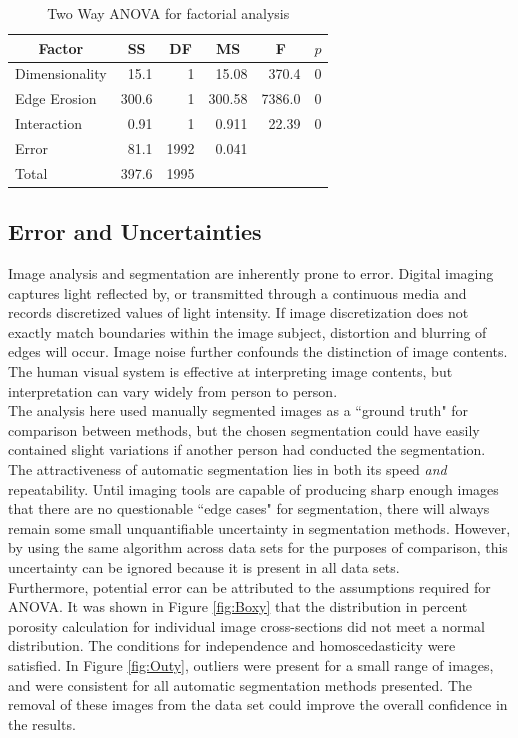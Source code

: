 \documentclass[11pt, twocolumn]{IEEEtran}
\begin{document}
\begin{table}[htbp]
	\centering
	\caption{Two Way ANOVA for factorial analysis}
	\begin{tabular}{|lrrrrr|}
		\toprule
		\multicolumn{1}{|c}{Factor} & \multicolumn{1}{c}{SS} & \multicolumn{1}{c}{DF} & \multicolumn{1}{c}{MS} & \multicolumn{1}{c}{F} & \multicolumn{1}{c|}{$p$ } \\
		\midrule
		Dimensionality & 15.1 & 1     & 15.08 & 370.4 & 0 \\
		Edge Erosion & 300.6 & 1     & 300.58 & 7386.0 & 0 \\
		Interaction & 0.91 & 1     & 0.911 & 22.39 & 0 \\
		Error & 81.1 & 1992  & 0.041 &       &  \\
		Total & 397.6 & 1995  &       &       &  \\
		\bottomrule
	\end{tabular}%
	\label{tab:TwoWay}%
\end{table}%


\subsection{Error and Uncertainties} 
Image analysis and segmentation are inherently prone to error. Digital imaging captures light reflected by, or transmitted through a continuous media and records discretized values of light intensity. If image discretization does not exactly match boundaries within the image subject, distortion and blurring of edges will occur. Image noise further confounds the distinction of image contents. The human visual system is effective at interpreting image contents, but interpretation can vary widely from person to person.\\
The analysis here used manually segmented images as a ``ground truth" for comparison between methods, but the chosen segmentation could have easily contained slight variations if another person had conducted the segmentation. The attractiveness of automatic segmentation lies in both its speed \textit{and} repeatability. Until imaging tools are capable of producing sharp enough images that there are no questionable ``edge cases" for segmentation, there will always remain some small unquantifiable uncertainty in segmentation methods. However, by using the same algorithm across data sets for the purposes of comparison, this uncertainty can be ignored because it is present in all data sets.\\
Furthermore, potential error can be attributed to the assumptions required for ANOVA. It was shown in Figure \ref{fig:Boxy} that the distribution in percent porosity calculation for individual image cross-sections did not meet a normal distribution. The conditions for independence and homoscedasticity were satisfied. In Figure \ref{fig:Outy}, outliers were present for a small range of images, and were consistent for all automatic segmentation methods presented. The removal of these images from the data set could improve the overall confidence in the results.
\end{document}
